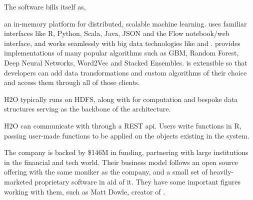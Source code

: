 The  software bills itself as,

\begin{displayquote}
    an in-memory platform for distributed, scalable machine learning. 
    uses familiar interfaces like R, Python, Scala, Java, JSON and the Flow
    notebook/web interface, and works seamlessly with big data technologies
    like  and .  provides implementations of many popular
    algorithms such as GBM, Random Forest, Deep Neural Networks, Word2Vec
    and Stacked Ensembles.  is extensible so that developers can add data
    transformations and custom algorithms of their choice and access them
    through all of those clients.
\end{displayquote}

H2O typically runs on HDFS, along with  for computation and bespoke
data structures serving as the backbone of the architecture.

H2O can communicate with \R through a REST api. Users write functions in
R, passing user-made functions to be applied on the objects existing in
the  system\cite{h2o.ai:_h2o}.

The company  is backed by \$146M in funding, partnering with large
institutions in the financial and tech world. Their business model
follows an open source offering with the same moniker as the company,
and a small set of heavily-marketed proprietary software in aid of it.
They have some important figures working with them, such as Matt Dowle,
creator of .
